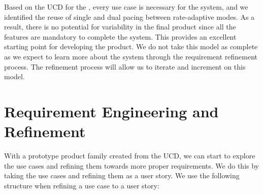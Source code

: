 Based on the UCD for the \pgd, every use case is necessary for the system, and we identified the reuse of single and dual pacing between rate-adaptive modes. As a result, there is no potential for variability in the final product since all the features are mandatory to complete the system. This provides an excellent starting point for developing the product. We do not take this model as complete as we expect to learn more about the system through the requirement refinement process. The refinement process will allow us to iterate and increment on this model.

\section{Requirement Engineering and Refinement}

With a prototype product family created from the UCD, we can start to explore the use cases and refining them towards more proper requirements. We do this by taking the use cases and refining them as a user story. We use the following structure when refining a use case to a user story:

